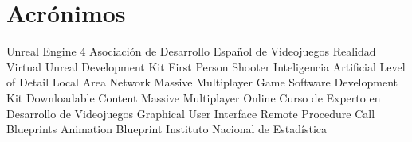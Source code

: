 \section*{Acrónimos}

{\small
\begin{acronym}[XXXXXXXX]
  	 {Unreal Engine 4}
  	 {Asociación de Desarrollo Español de Videojuegos}
  		 {Realidad Virtual}
   	 {Unreal Development Kit}
  	 {First Person Shooter}
  		 {Inteligencia Artificial}
  	 {Level of Detail}
  	 {Local Area Network}
  	 {Massive Multiplayer Game}
       {Software Development Kit}
  	 {Downloadable Content}
  	 {Massive Multiplayer Online}
  	 {Curso de Experto en Desarrollo de Videojuegos}
  	 {Graphical User Interface}
  	 {Remote Procedure Call}
  		 {Blueprints}
  	 {Animation Blueprint}
  	 {Instituto Nacional de Estadística}
\end{acronym}
}

